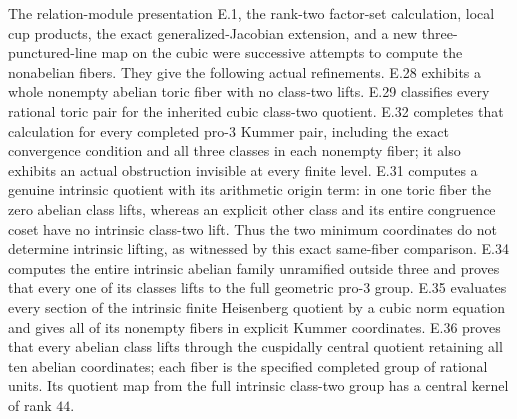 The relation-module presentation E.1, the rank-two factor-set
calculation, local cup products, the exact generalized-Jacobian
extension, and a new three-punctured-line map on the cubic were
successive attempts to compute the nonabelian fibers. They give
the following actual refinements. E.28 exhibits a whole
nonempty abelian toric fiber with no class-two lifts. E.29
classifies every rational toric pair for the inherited cubic
class-two quotient. E.32 completes that calculation for every
completed pro-$3$ Kummer pair, including the exact convergence
condition and all three classes in each nonempty fiber; it also
exhibits an actual obstruction invisible at every finite level.
E.31 computes a genuine intrinsic quotient with its
arithmetic origin term: in one toric fiber the zero abelian
class lifts, whereas an explicit other class and its entire
congruence coset have no intrinsic class-two lift. Thus the
two minimum coordinates do not determine intrinsic lifting,
as witnessed by this exact same-fiber comparison.
E.34 computes the entire intrinsic abelian family unramified
outside three and proves that every one of its classes lifts
to the full geometric pro-$3$ group.
E.35 evaluates every section of the intrinsic finite
Heisenberg quotient by a cubic norm equation and gives all
of its nonempty fibers in explicit Kummer coordinates.
E.36 proves that every abelian class lifts through the
cuspidally central quotient retaining all ten abelian
coordinates; each fiber is the specified completed group
of rational units. Its quotient map from the full
intrinsic class-two group has a central kernel of rank $44$.

